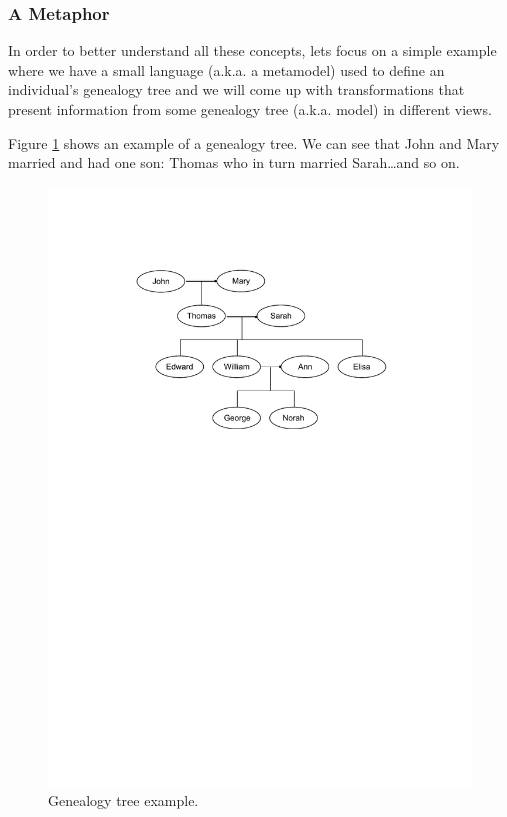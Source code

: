 \clearpage

\subsubsection{A Metaphor}
\label{subsubsec:metaphor}

In order to better understand all these concepts, lets focus on a simple example where
we have a small language (a.k.a. a metamodel) used to define an individual's genealogy tree and we will come up with transformations that present information from some genealogy tree (a.k.a. model) in different views.

Figure \ref{fig:genealogy_tree_example} shows an example of a genealogy tree. We
can see that John and Mary married and had one son: Thomas who in turn married
Sarah\ldots and so on.

\begin{figure}[h]
\begin{center}
  \includegraphics[scale=1, trim=4.1cm 17.4cm 4.1cm 3.6cm,
  clip]{imgs/genealogy_tree_example.pdf}
  \caption{Genealogy tree example.}
  \label{fig:genealogy_tree_example}
\end{center}
\end{figure}

